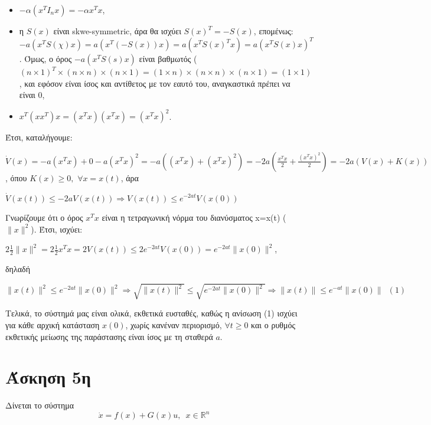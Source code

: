 \documentclass{article}
\begin{document}
\begin{itemize}
  \item \(-α(x^T I_n x) = -α x^T x\),
  \item η \(S(x)\) είναι skwe-symmetric, άρα θα ισχύει \(S(x)^T = -S (x)\), επομένως: \newline
  \(-a(x^T S(χ) x) = a(x^T (-S(x)) x) = a(x^T S(x)^T x) = a(x^T S(x) x)^T\). Όμως, ο όρος \(-a(x^T S(s) x)\) είναι βαθμωτός (\((n \times 1)^T \times (n \times n) \times (n \times 1) = (1 \times n) \times (n \times n) \times (n \times 1) = (1 \times 1)\), και εφόσον είναι ίσος και αντίθετος με τον εαυτό του, αναγκαστικά πρέπει να είναι 0,
  \item \(x^T(x x^T)x = (x^T x)(x^T x) = (x^T x)^{2}\).
\end{itemize}

\hfill\break
Έτσι, καταλήγουμε:

\hfill\break
\begin{math}
    \dot{V}(x) = -a (x^T x) + 0 - a(x^T x)^2 = -a ((x^T x) + (x^T x)^2) = -2a (\frac{x^T x}{2} + \frac{(x^T x)^2}{2}) = -2a (V(x) + K(x))
\end{math}, όπου \(K(x) \geq 0,\,\,\forall x = x(t)\), άρα

\begin{math}
    \dot{V}(x(t)) \leq -2a V(x(t)) \Rightarrow V(x(t)) \leq e^{-2at} V(x(0))
\end{math}

\hfill\break
Γνωρίζουμε ότι ο όρος \(x^T x\) είναι η τετραγωνική νόρμα του διανύσματος x=x(t) (\(\|x\|^2\)). Έτσι, ισχύει:

\hfill\break
\begin{math}
    2\frac{1}{2}\|x\|^{2} = 2\frac{1}{2}x^T x = 2V(x(t)) \le 2e^{-2a t}V(x(0)) = e^{-2a t}\|x(0)\|^{2}
\end{math},

\hfill\break
δηλαδή

\hfill\break
\begin{math}
    \|x(t)\|^2 \le e^{-2at}\|x(0)\|^2 \Rightarrow
    \sqrt{\|x(t)\|^2} \leq \sqrt{e^{-2at}\|x(0)\|^2} \Rightarrow
    \|x(t)\| \le e^{-at}\|x(0)\|\,\,\, (1)
\end{math}

\hfill\break
Τελικά, το σύστημά μας είναι ολικά, εκθετικά ευσταθές, καθώς η ανίσωση (1) ισχύει για κάθε αρχική κατάσταση \(x(0)\), χωρίς κανέναν περιορισμό, \(\forall t \geq 0\) και ο ρυθμός εκθετικής μείωσης της παράστασης είναι ίσος με τη σταθερά \(a\).

\section{Άσκηση 5η}
Δίνεται το σύστημα
\begin{equation*}
    \dot{x} = f(x) + G(x)u,\,\,\,x \in \mathbb{R}^n    
\end{equation*}
\end{document}
